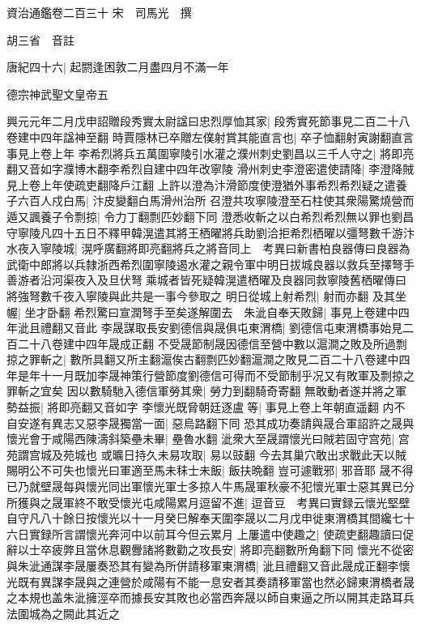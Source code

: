 資治通鑑卷二百三十
宋　司馬光　撰

胡三省　音註

唐紀四十六|{
	起閼逢困敦二月盡四月不滿一年}


德宗神武聖文皇帝五

興元元年二月戊申詔贈段秀實太尉諡曰忠烈厚恤其家|{
	段秀實死節事見二百二十八卷建中四年諡神至翻}
時賈隱林已卒贈左僕射賞其能直言也|{
	卒子恤翻射寅謝翻直言事見上卷上年}
李希烈將兵五萬圍寧陵引水灌之濮州刺史劉昌以三千人守之|{
	將即亮翻又音如字濮博木翻李希烈自建中四年改寧陵}
滑州刺史李澄密遣使請降|{
	李澄降賊見上卷上年使疏吏翻降戶江翻}
上許以澄為汴滑節度使澄猶外事希烈希烈疑之遣養子六百人戍白馬|{
	汴皮變翻白馬滑州治所}
召澄共攻寧陵澄至石柱使其衆陽驚燒營而遁又諷養子令剽掠|{
	令力丁翻剽匹妙翻下同}
澄悉收斬之以白希烈希烈無以罪也劉昌守寧陵凡四十五日不釋甲韓滉遣其將王栖曜將兵助劉洽拒希烈栖曜以彊弩數千游汴水夜入寧陵城|{
	滉呼廣翻將即亮翻將兵之將音同上　考異曰新書柏良器傳曰良器為武衛中郎將以兵隸浙西希烈圍寧陵遏水灌之親令軍中明日拔城良器以救兵至擇弩手善游者沿河渠夜入及旦伏弩乘城者皆死疑韓滉遣栖曜及良器同救寧陵舊栖曜傳曰將強弩數千夜入寧陵與此共是一事今參取之}
明日從城上射希烈|{
	射而亦翻}
及其坐幄|{
	坐才卧翻}
希烈驚曰宣潤弩手至矣遂解圍去　朱泚自奉天敗歸|{
	事見上卷建中四年泚且禮翻又音此}
李晟謀取長安劉德信與晟俱屯東渭橋|{
	劉德信屯東渭橋事始見二百二十八卷建中四年晟成正翻}
不受晟節制晟因德信至營中數以滬澗之敗及所過剽掠之罪斬之|{
	數所具翻又所主翻滬俟古翻剽匹妙翻滬澗之敗見二百二十八卷建中四年是年十一月既加李晟神策行營節度劉德信可得而不受節制乎况又有敗軍及剽掠之罪斬之宜矣}
因以數騎馳入德信軍勞其衆|{
	勞力到翻騎奇寄翻}
無敢動者遂并將之軍勢益振|{
	將即亮翻又音如字}
李懷光既脅朝廷逐盧等|{
	事見上卷上年朝直遥翻}
内不自安遂有異志又惡李晟獨當一面|{
	惡烏路翻下同}
恐其成功奏請與晟合軍詔許之晟與懷光會于咸陽西陳濤斜築壘未畢|{
	壘魯水翻}
泚衆大至晟謂懷光曰賊若固守宫苑|{
	宫苑謂宫城及苑城也}
或曠日持久未易攻取|{
	易以豉翻}
今去其巢穴敢出求戰此天以賊賜明公不可失也懷光曰軍適至馬未秣士未飯|{
	飯扶晩翻}
豈可遽戰邪|{
	邪音耶}
晟不得已乃就壁晟每與懷光同出軍懷光軍士多掠人牛馬晟軍秋豪不犯懷光軍士惡其異已分所獲與之晟軍終不敢受懷光屯咸陽累月逗留不進|{
	逗音豆　考異曰實録云懷光堅壁自守凡八十餘日按懷光以十一月癸巳解奉天圍李晟以二月戊申徙東渭橋其間纔七十六日實録所言謂懷光奔河中以前耳今但云累月}
上屢遣中使趣之|{
	使疏吏翻趣讀曰促}
辭以士卒疲弊且當休息觀釁諸將數勸之攻長安|{
	將即亮翻數所角翻下同}
懷光不從密與朱泚通謀李晟屢奏恐其有變為所併請移軍東渭橋|{
	泚且禮翻又音此晟成正翻李懷光既有異謀李晟與之連營於咸陽有不能一息安者其奏請移軍當也然必歸東渭橋者晟之本規也盖朱泚擁涇卒而據長安其敗也必當西奔晟以師自東逼之所以開其走路耳兵法圍城為之闕此其近之}
